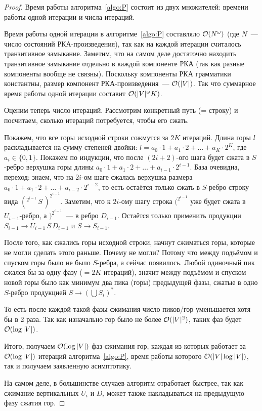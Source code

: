 \begin{proof}
  Время работы алгоритма~\ref{algo:P} состоит из двух множителей: времени работы одной итерации и числа итераций.

  Время работы одной итерации в алгоритме~\ref{algo:P} составляло $\mathcal{O}(N^{\omega})$ (где $N$~--- число состояний РКА-произведения), так как на каждой итерации считалось транзитивное замыкание. Заметим, что на самом деле достаточно находить транзитивное замыкание отдельно в каждой компоненте РКА (так как разные компоненты вообще не связны). Поскольку компоненты РКА грамматики константны, размер компонент РКА-произведения~--- $\mathcal{O}(|V|)$. Так что суммарное время работы одной итерации составит $\mathcal{O}(|V|^{\omega} K)$.

  Оценим теперь число итераций. Рассмотрим конкретный путь (= строку) и посчитаем, сколько итераций потребуется, чтобы его сжать.

  Покажем, что все горы исходной строки сожмутся за $2K$ итераций. Длина горы $l$ раскладывается на сумму степеней двойки: $l = a_0 \cdot 1 + a_1 \cdot 2 + \dots + a_K \cdot 2^{K}$, где $a_i \in \{0, 1\}$. Покажем по индукции, что после $(2i+2)$-ого шага будет сжата в $S$-ребро верхушка горы длины $a_0 \cdot 1 + a_1 \cdot 2 + \dots + a_{i-1} \cdot 2^{i-1}$. База очевидна, переход: знаем, что на $2i$-ом шаге сжалась верхушка размера $a_0 \cdot 1 + a_1 \cdot 2 + \dots + a_{i-2} \cdot 2^{i-2}$, то есть остаётся только сжать в $S$-ребро строку вида $(^{2^{i-1}} \, S \, )^{2^{i-1}}$. Заметим, что к $2i$-ому шагу строка $(^{2^{i-1}}$ уже будет сжата в $U_{i-1}$-ребро, а $)^{2^{i-1}}$~--- в ребро $D_{i-1}$. Остаётся только применить продукции $S_{i-1} \to U_{i-1} \, S \, D_{i-1}$ и $S \to S_{i-1}$.


  После того, как сжались горы исходной строки, начнут сжиматься горы, которые не могли сделать этого раньше. Почему не могли? Потому что между подъёмом и спуском горы было не было $S$-ребра, а сейчас появилось. Любой одиночный пик сжался бы за одну фазу ($= 2K$ итераций), значит между подъёмом и спуском новой горы было как минимум два пика (горы) предыдущей фазы, сжатые в одно $S$-ребро продукцией $S \to (\bigcup S_i)^{*}$. 


  То есть после каждой такой фазы сжимания число пиков/гор уменьшается хотя бы в 2 раза. Так как изначально гор было не более $\mathcal{O}(|V|^2)$, таких фаз будет $\mathcal{O}(\log |V|)$.

  Итого, получаем $\mathcal{O}(\log |V|)$ фаз сжимания гор, каждая из которых работает за $\mathcal{O}(\log |V|)$ итераций алгоритма~\ref{algo:P}, время работы которого $\mathcal{O}(|V| \log |V|)$, так и получаем заявленную асимптотику.

  На самом деле, в большинстве случаев алгоритм отработает быстрее, так как сжимание вертикальных $U_i$ и $D_i$ может также накладываться на предыдущую фазу сжатия гор.

\end{proof}

